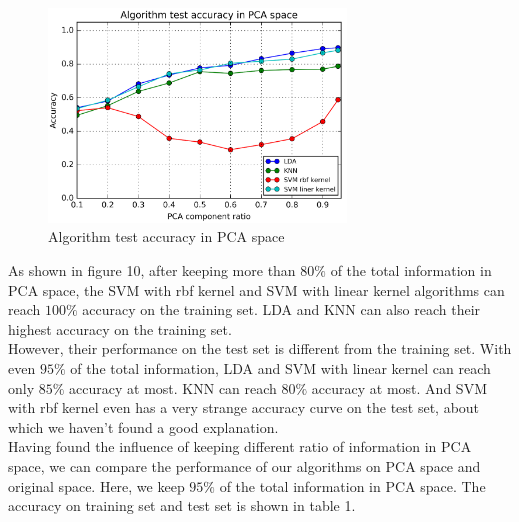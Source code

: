 \documentclass[11pt,letterpaper]{article}
\begin{document}
\begin{figure}[H]
\centering
\includegraphics[width=79mm]{little_total_test.png}
\caption{Algorithm test accuracy in PCA space}
\label{test.lable}
\end{figure}

As shown in figure 10, after keeping more than $80\%$ of the total information in PCA space, the SVM with rbf kernel and SVM with linear kernel algorithms can reach $100\%$ accuracy on the training set. LDA and KNN can also reach their highest accuracy on the training set.\\

However, their performance on the test set is different from the training set. With even $95\%$ of the total information, LDA and SVM with linear kernel can reach only $85\%$ accuracy at most. KNN can reach $80\%$ accuracy at most. And SVM with rbf kernel even has a very strange accuracy curve on the test set, about which we haven't found a good explanation.\\

Having found the influence of keeping different ratio of information in PCA space, we can compare the performance of our algorithms on PCA space and original space. Here, we keep $95\%$ of the total information in PCA space. The accuracy on training set and test set is shown in table 1.
\end{document}
